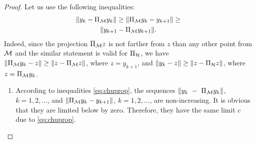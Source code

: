 \documentclass[sii]{ipart}
\begin{document}
\begin{proof}
	Let us use the following inequalities:
	\begin{multline}
	\label{eq:chuprop}
	\|y_k - \Pi_{\calM} y_k\| \ge \|\Pi_{\calM} y_k - y_{k + 1}\| \ge \\ \|y_{k+1} - \Pi_{\calM} y_{k + 1}\|.
	\end{multline}
Indeed, since the projection $\Pi_{\mathcal{M}} z$ is not farther from $z$ than any other point from $\mathcal{M}$ and the similar statement is valid for
$\Pi_{\mathcal{H}}$, we have $\|\Pi_{\mathcal{M}} y_k - z\| \ge \|z - \Pi_{\mathcal{M}} z\|$, where $z=y_{k+1}$, and $\|y_k - z\| \ge \|z - \Pi_{\mathcal{H}} z\|$, where $z=\Pi_{\mathcal{M}} y_k$.
	\begin{enumerate}
		\item According to inequalities \eqref{eq:chuprop}, the sequences $\|y_k~-~\Pi_{\mathcal{M}} y_k\|$, $k = 1, 2, \ldots$, and $\|\Pi_{\mathcal{M}} y_k - y_{k + 1}\|$, $k = 1, 2, \ldots$, are non-increasing. It is obvious that they are limited below by zero. Therefore, they have the same limit $c$ due to \eqref{eq:chuprop}.
		

\end{enumerate}
\end{proof}
\end{document}

